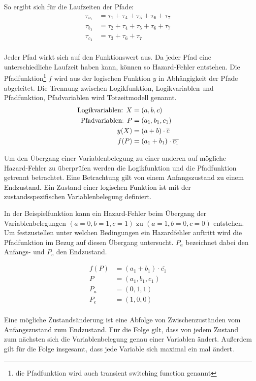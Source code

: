 So ergibt sich für die Laufzeiten der Pfade:
\begin{align*}
	\tau_{a_1} &= \tau_1 + \tau_4 + \tau_5 + \tau_6 + \tau_7 \\
	\tau_{b_1} &= \tau_2 + \tau_4 + \tau_5 + \tau_6 + \tau_7 \\
	\tau_{c_1} &= \tau_3 + \tau_6 + \tau_7 \\
\end{align*}

Jeder Pfad wirkt sich auf den Funktionswert aus. Da jeder Pfad eine unterschiedliche Laufzeit haben kann, können so Hazard-Fehler entstehen. Die Pfadfunktion\footnote{die Pfadfunktion wird auch transient switching function genannt} $f$ wird aus der logischen Funktion $y$ in Abhängigkeit der Pfade abgeleitet. Die Trennung zwischen Logikfunktion, Logikvariablen und Pfadfunktion, Pfadvariablen wird Totzeitmodell genannt.
\begin{align*}
	\textnormal{Logikvariablen: } X &= (a, b, c) \\
	\textnormal{Pfadvariablen: } P &= (a_1, b_1, c_1) \\
	y(X) &= (a + b) \cdot \overline{c} \\
	f(P) &= (a_1 + b_1) \cdot \overline{c_1} \\	
\end{align*}  

Um den Übergang einer Variablenbelegung zu einer anderen auf mögliche Hazard-Fehler zu überprüfen werden die Logikfunktion und die Pfadfunktion getrennt betrachtet. Eine Betrachtung gilt von einem Anfangszustand zu einem Endzustand. Ein Zustand einer logischen Funktion ist mit der zustandsspezifischen Variablenbelegung definiert.

In der Beispielfunktion kann ein Hazard-Fehler beim Übergang der Variablenbelegungen $(a=0, b=1, c=1)$ zu $(a=1, b=0, c=0)$ entstehen. Um festzustellen unter welchen Bedingungen ein Hazardfehler auftritt wird die Pfadfunktion im Bezug auf diesen Übergang untersucht. $P_a$ bezeichnet dabei den Anfangs- und $P_e$ den Endzustand.

\begin{align*}
	f(P) &= (a_1 + b_1) \cdot \overline{c_1} \\
	P    &= (a_1, b_1, c_1) \\
	P_a  &= (0,1,1) \\
	P_e  &= (1,0,0) \\
\end{align*}

Eine mögliche Zustandsänderung ist eine Abfolge von Zwischenzuständen vom Anfangszustand zum Endzustand. Für die Folge gilt, dass von jedem Zustand zum nächsten sich die Variablenbelegung genau einer Variablen ändert. Außerdem gilt für die Folge insgesamt, dass jede Variable sich maximal ein mal ändert. 

